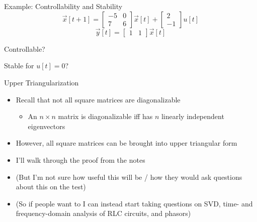 \begin{frame}{Example: Controllability and Stability}
    \[
        \vec x[t + 1] = \begin{bmatrix}
            -5 & 0 \\
            7 & 6
            \end{bmatrix} \vec x[t] +  \begin{bmatrix} 2 \\ -1\end{bmatrix} u[t]
    \]
    \[
        \vec y[t] = \begin{bmatrix} 1 & 1 \end{bmatrix} \vec x[t]
   \]

   Controllable? 
   
    Stable for \(u[t] = 0\)?
\end{frame}

\begin{frame}{Upper Triangularization}

    \begin{itemize}
        \item
Recall that not all square matrices are diagonalizable
            \begin{itemize}
        \item
           An \(n \times n\) matrix is diagonalizable iff has \(n\) linearly independent eigenvectors
            \end{itemize}
        \item
However, all square matrices can be brought into upper triangular form
        \item
I’ll walk through the proof from the notes
        \item
(But I’m not sure how useful this will be / how they would ask questions about this on the test)
        \item
(So if people want to I can instead start taking questions on SVD, time- and frequency-domain analysis of RLC circuits, and phasors)
    \end{itemize}
\end{frame}

